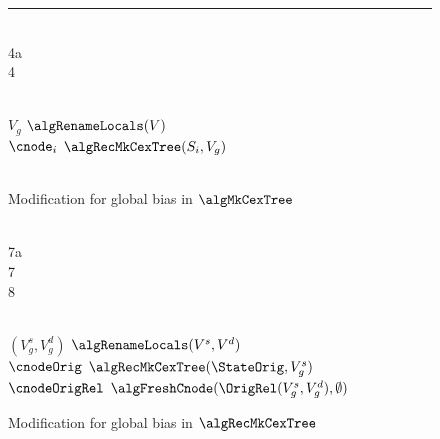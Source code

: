\begin{figure}[t]
\small
\hrule
  \centering
  \begin{minipage}[t]{\columnwidth}
    \begin{minipage}[t]{.04\columnwidth}
      \mbox{} \\  4a \\ 4 \\ 
    \end{minipage}
    \begin{minipage}[t]{.94\columnwidth}
      \mbox{}\\
      $V_g$ \algAssgn $\algRenameLocals(V)$ \\
      $\cnode_i$ \algAssgn $\algRecMkCexTree(S_i,V_g)$\\
    \end{minipage}\\
  \caption{ Modification for global bias in $\algMkCexTree$}
   \label{fig-alg-cex-global-bias-mkcex}
  \begin{minipage}[t]{.04\columnwidth}
   \mbox{} \\ 7a \\ 7 \\ 8 
  \end{minipage}
  \begin{minipage}[t]{.94\columnwidth}
    \mbox{}\\
    $(V^{s}_g,V^{d}_g)$ \algAssgn $\algRenameLocals(V^{s},V^{d})$ \\
    $\cnodeOrig$ \algAssgn $\algRecMkCexTree(\StateOrig,V^{s}_g)$ \\
    $\cnodeOrigRel$ \algAssgn $\algFreshCnode(\OrigRel(V^{s}_g,V^{d}_g), \emptyset)$ \\
  \end{minipage}
  \caption{ Modification for global bias in $\algRecMkCexTree$}
  \label{fig-alg-cex-global-bias-mkrec}
  \end{minipage}
  \vspace{1ex}
  \linespread{1}
\end{figure}

